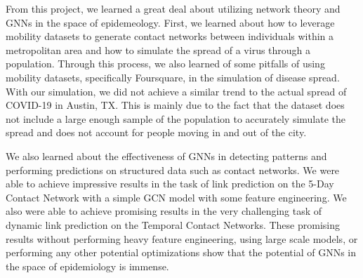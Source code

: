 \documentclass[times, 10pt,twocolumn]{article}
\begin{document}
From this project, we learned a great deal about utilizing network theory and GNNs in the space of epidemeology. First, we learned about how to leverage mobility datasets to generate contact networks between individuals within a metropolitan area and how to simulate the spread of a virus through a population. Through this process, we also learned of some pitfalls of using mobility datasets, specifically Foursquare, in the simulation of disease spread. With our simulation, we did not achieve a similar trend to the actual spread of COVID-19 in Austin, TX. This is mainly due to the fact that the dataset does not include a large enough sample of the population to accurately simulate the spread and does not account for people moving in and out of the city. 

We also learned about the effectiveness of GNNs in detecting patterns and performing predictions on structured data such as contact networks. We were able to achieve impressive results in the task of link prediction on the 5-Day Contact Network with a simple GCN model with some feature engineering. We also were able to achieve promising results in the very challenging task of dynamic link prediction on the Temporal Contact Networks. These promising results without performing heavy feature engineering, using large scale models, or performing any other potential optimizations show that the potential of GNNs in the space of epidemiology is immense.





\end{document}
